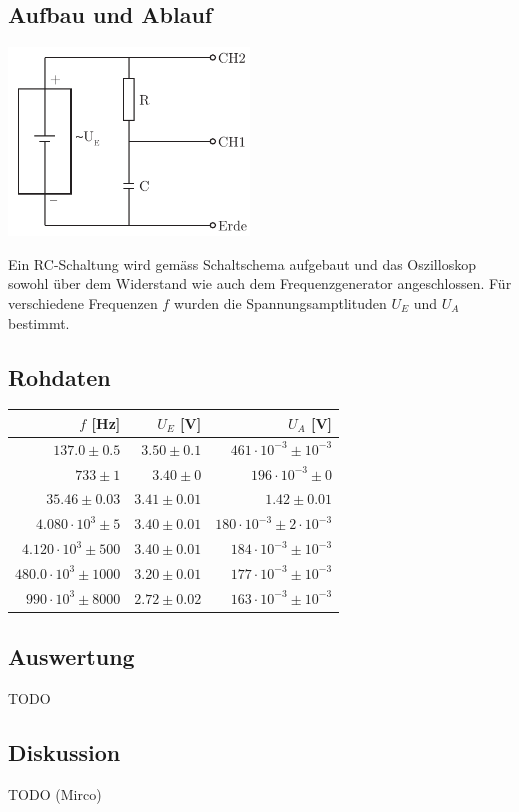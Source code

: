 \documentclass[12pt,a4paper]{article}
\begin{document}
\subsection*{Aufbau und Ablauf}
\includegraphics[height=5cm]{illustration3.pdf}

\noindent
Ein RC-Schaltung wird gem\"ass Schaltschema aufgebaut und das Oszilloskop sowohl \"uber dem Widerstand wie auch dem Frequenzgenerator angeschlossen. F\"ur verschiedene Frequenzen $f$ wurden die Spannungsamptlituden $U_E$ und $U_A$ bestimmt.

\subsection*{Rohdaten} 
\begin{tabular}{|r|r|r|}
\hline
$f$ [Hz]&$U_E$ [V]&$U_A$ [V]\\
\hline
$137.0 \pm 0.5$&$3.50 \pm 0.1$&$461\cdot 10^{-3} \pm 10^{-3}$\\
$733 \pm 1$&$3.40 \pm 0$&$196\cdot 10^{-3} \pm 0$\\
$35.46 \pm 0.03$&$3.41 \pm 0.01$&$1.42 \pm 0.01$\\
$4.080\cdot 10^{3} \pm 5$&$3.40 \pm 0.01$&$180\cdot 10^{-3} \pm 2\cdot 10^{-3}$\\
$4.120\cdot 10^{3} \pm 500$&$3.40 \pm 0.01$&$184\cdot 10^{-3} \pm 10^{-3}$\\
$480.0\cdot 10^{3} \pm 1000$&$3.20 \pm 0.01$&$177\cdot 10^{-3} \pm 10^{-3}$\\
$990\cdot 10^{3} \pm 8000$&$2.72 \pm 0.02$&$163\cdot 10^{-3} \pm 10^{-3}$\\
\hline
\end{tabular}

\subsection*{Auswertung}
TODO

\subsection*{Diskussion}
TODO (Mirco)
\end{document}
